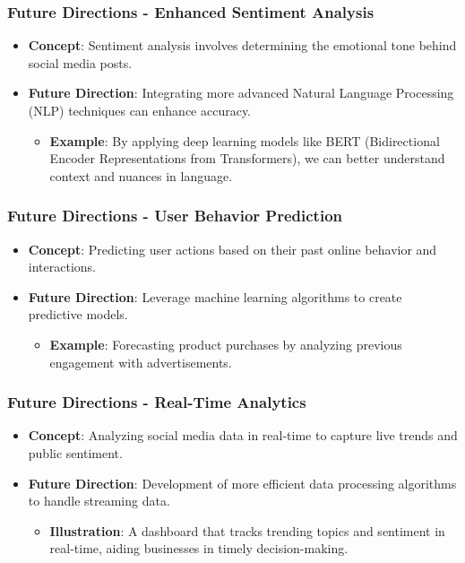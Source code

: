 \documentclass{beamer}
\begin{document}
\begin{frame}[fragile]
    \frametitle{Future Directions - Enhanced Sentiment Analysis}
    \begin{itemize}
        \item \textbf{Concept}: Sentiment analysis involves determining the emotional tone behind social media posts.
        \item \textbf{Future Direction}: Integrating more advanced Natural Language Processing (NLP) techniques can enhance accuracy.
        \begin{itemize}
            \item \textbf{Example}: By applying deep learning models like BERT (Bidirectional Encoder Representations from Transformers), we can better understand context and nuances in language.
        \end{itemize}
    \end{itemize}
\end{frame}

\begin{frame}[fragile]
    \frametitle{Future Directions - User Behavior Prediction}
    \begin{itemize}
        \item \textbf{Concept}: Predicting user actions based on their past online behavior and interactions.
        \item \textbf{Future Direction}: Leverage machine learning algorithms to create predictive models.
        \begin{itemize}
            \item \textbf{Example}: Forecasting product purchases by analyzing previous engagement with advertisements.
        \end{itemize}
    \end{itemize}
\end{frame}

\begin{frame}[fragile]
    \frametitle{Future Directions - Real-Time Analytics}
    \begin{itemize}
        \item \textbf{Concept}: Analyzing social media data in real-time to capture live trends and public sentiment.
        \item \textbf{Future Direction}: Development of more efficient data processing algorithms to handle streaming data.
        \begin{itemize}
            \item \textbf{Illustration}: A dashboard that tracks trending topics and sentiment in real-time, aiding businesses in timely decision-making.
        \end{itemize}
    \end{itemize}
\end{frame}
\end{document}
